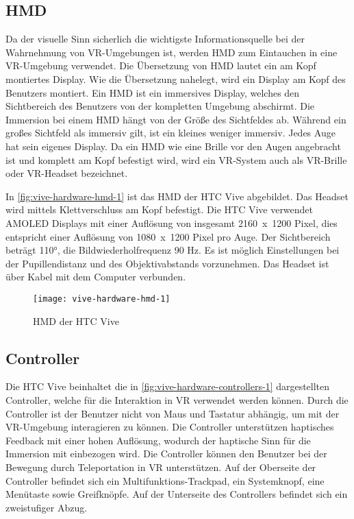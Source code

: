 \subsection{\acl{HMD}}
Da der visuelle Sinn \glqq sicherlich die wichtigste Informationsquelle bei der Wahrnehmung\grqq \cite{DoernerWahrnehmung} von \ac{VR}-Umgebungen ist, werden \ac{HMD} zum Eintauchen in eine \ac{VR}-Umgebung verwendet. Die Übersetzung von \ac{HMD} lautet \glqq ein am Kopf montiertes Display\grqq. Wie die Übersetzung nahelegt, wird ein Display am Kopf des Benutzers montiert. Ein \ac{HMD} ist ein immersives Display, welches den Sichtbereich des Benutzers von der kompletten Umgebung abschirmt. Die Immersion bei einem \ac{HMD} hängt von der Größe des Sichtfeldes ab. Während ein großes Sichtfeld als immersiv gilt, ist ein kleines weniger immersiv. \cite{Doerner2019} Jedes Auge hat sein eigenes Display. Da ein \ac{HMD} wie eine Brille vor den Augen angebracht ist und komplett am Kopf befestigt wird, wird ein \ac{VR}-System auch als \ac{VR}-Brille oder \ac{VR}-Headset bezeichnet.

In \autoref{fig:vive-hardware-hmd-1} ist das \ac{HMD} der HTC Vive abgebildet. Das Headset wird mittels Klettverschluss am Kopf befestigt. Die HTC Vive verwendet AMOLED Displays mit einer Auflösung von insgesamt \mbox{2160 x 1200} Pixel, dies entspricht einer Auflösung von \mbox{1080 x 1200} Pixel pro Auge. Der Sichtbereich beträgt 110°, die Bildwiederholfrequenz 90 Hz. Es ist möglich Einstellungen bei der Pupillendistanz und des Objektivabstands vorzunehmen. Das Headset ist über Kabel mit dem Computer verbunden. \cite{ViveProduct}

\begin{figure}[!htbp]
	\centering
	\texttt{[image: vive-hardware-hmd-1]}
	\caption[HMD der HTC Vive]{\acs{HMD} der HTC Vive \cite{ViveHMD}}
	\label{fig:vive-hardware-hmd-1}
\end{figure}

\subsection{Controller}
Die HTC Vive beinhaltet die in \autoref{fig:vive-hardware-controllers-1} dargestellten Controller, welche für die Interaktion in \ac{VR} verwendet werden können. Durch die Controller ist der Benutzer nicht von Maus und Tastatur abhängig, um mit der \ac{VR}-Umgebung interagieren zu können. Die Controller unterstützen haptisches Feedback mit einer hohen Auflösung, wodurch der haptische Sinn für die Immersion mit einbezogen wird. Die Controller können den Benutzer bei der Bewegung durch Teleportation in \ac{VR} unterstützen. Auf der Oberseite der Controller befindet sich ein Multifunktions-Trackpad, ein Systemknopf, eine Menütaste sowie Greifknöpfe. Auf der Unterseite des Controllers befindet sich ein zweistufiger Abzug. \cite{ViveProduct}

